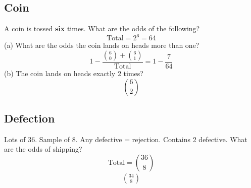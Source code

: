 \documentclass[]{article}
\newcommand{\bd}{\textbf}
\begin{document}
	\subsection*{Coin}
	\par A coin is tossed \bd{six} times. What are the odds of the following?
	\begin{equation*}
		\text{Total} = 2^6 = 64
	\end{equation*}
	(a) What are the odds the coin lands on heads more than one?
	\begin{equation*}
		1 - \frac{{6 \choose 0} + {6 \choose 1}}{\text{Total}} = 1 - \frac{7}{64}
	\end{equation*}
	(b) The coin lands on heads exactly 2 times?
	\begin{equation*}
		{6 \choose 2}
	\end{equation*}

	\subsection*{Defection}
	\par Lots of 36. Sample of 8. Any defective = rejection. Contains 2 defective. What are the odds of shipping?
	\begin{equation*}
		\text{Total} = {36 \choose 8}
	\end{equation*}
	\begin{align*}
		34 \choose 8
	\end{align*}
\end{document}
